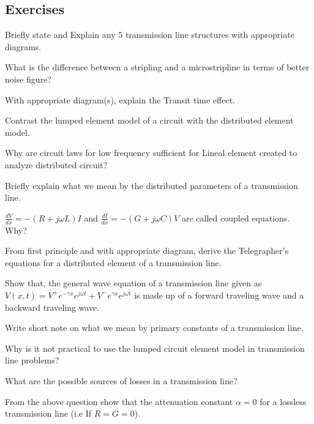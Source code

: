 \begin{mdframed}[backgroundcolor=lightblue, linewidth=1pt, hidealllines=true]
\section*{Exercises}
\begin{ExerciseList}
\Exercise[label={ex21}] 
Briefly state and Explain any 5 transmission line structures with appropriate diagrams.

\Exercise[label={ex22}] 
What is the difference between a stripling and a microstripline in terms of better noise figure?

\Exercise[label={ex23}] 
With appropriate diagram(s), explain the Transit time effect.

\Exercise[label={ex24}] 
Contrast the lumped element model of a circuit with the distributed element model.

\Exercise[label={ex25}] 
Why are circuit laws for low frequency sufficient for Lineal element created to analyze distributed circuit?

\Exercise[label={ex26}] 
Briefly explain what we mean by the distributed parameters of a transmission line.

\Exercise[label={ex27}] 
$\frac{dV}{dx} = -(R + j\omega L)I$ and  $ \frac{dI}{dx} = -(G + j\omega C)V$ are called coupled equations. Why?

\Exercise[label={ex28}] 
From first principle and with appropriate diagram, derive the Telegrapher's equations for a distributed element of a transmission line.

\Exercise[label={ex29}] 
Show that, the general wave equation of a transmission line given as $ V(x,t) = V^{+} e^{-\gamma x}e^{j\omega t} + V^{-} e^{\gamma x}e^{j\omega t} $ is made up of a forward traveling wave and a backward traveling wave.

\Exercise[label={ex210}] 
Write short note on what we mean by primary constants of a transmission line.

\Exercise[label={ex211}] 
Why is it not practical to use the lumped circuit element model in transmission line problems?

\Exercise[label={ex212}] 
What are the possible sources of losses in a transmission line?

\Exercise[label={ex217}]
From the above question show that the  attenuation constant $\alpha=0$ for a lossless transmission line (i.e If $R=G=0$).


\end{ExerciseList}
\end{mdframed}
